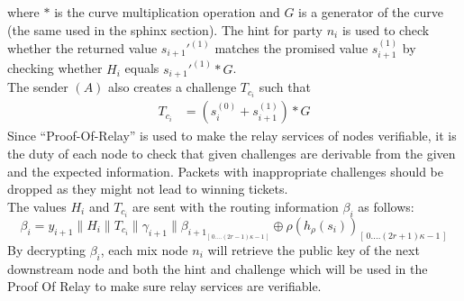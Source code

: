     where $*$ is the curve multiplication operation and $G$ is a generator of the curve (the same used in the sphinx section). 
    \newline The hint for party $n_i$ is used to check whether the returned value $s_{i+1}'^{(1)}$ matches the promised value $s_{i+1}^{(1)}$ by checking whether $H_i$ equals $s_{i+1}'^{(1)}*G$. 
   \\The sender $(A)$ also creates a challenge $T_{c_i}$ such that 
   \begin{align}  
    T_{c_i}&=(s_i^{(0)}+s_{i+1}^{(1)})*G
     \end{align}
   Since “Proof-Of-Relay” is used to make the relay services of nodes verifiable, it is the duty of each node to check that given challenges are derivable from the given and the expected information.
Packets with inappropriate challenges should be dropped as they might not lead to winning tickets.
\\The values $H_i$ and $T_{c_i}$ are sent with the routing information $\beta_i$ as follows:
$$\beta_i=y_{i+1}\|H_i\|T_{c_i}\|\gamma_{i+1}\|\beta_{{i+1}_{[ \,0....(2r-1)\kappa-1\,] }}\oplus \rho(h_{\rho}(s_{i}))_{[ \,0....(2r+1)\kappa-1\,]}$$
By decrypting $\beta_i$, each mix node $n_i$ will retrieve the public key of the next downstream node and both the hint and challenge which will be used in the Proof Of Relay to make sure relay services are verifiable.

\begin{comment}
 \begin{figure}[H]
    \centering
    \begin{tabular}{| m{2em} | m{15em} | m{2em} |}
        \hline
        $\alpha$ & $\beta$                   & $\gamma$ \\
                 & \begin{tabular}{| c m{2em} | m{3em} | m{6em} |}
            \hline
            \multicolumn{2}{| c |}{$Y_B$} & $hint_B$                 & $challenge_{BC}$ \\
            \hline
            \multicolumn{2}{| c |}{$Y_C$} & $hint_C$                 & $random$         \\
            \hline
            \multicolumn{2}{| c |}{$Y_D$} & $hint_D$                 & $random$         \\
            \hline
            End                           & \multicolumn{3}{| l |}{}                    \\
            \hline
        \end{tabular} &          \\[3em]
        \hline
    \end{tabular}
    \caption{SPHINX with PoR}
    \label{fig:SPHINX with PoR}
\end{figure}
\end{comment}